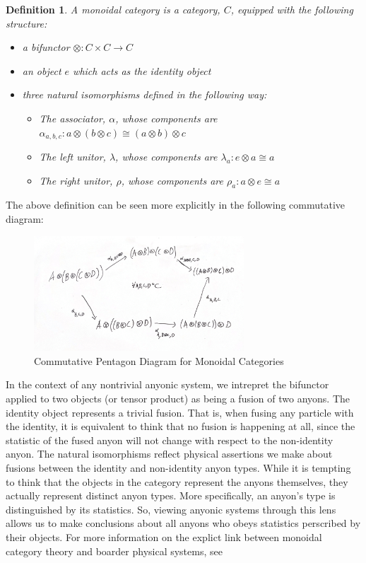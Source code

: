 \documentclass[10pt]{ucthesis}
\newtheorem{definition}{Definition}[chapter]
\begin{document}
\begin{definition}
	A monoidal category is a category, $C$, equipped with the following structure:
\begin{itemize}
	\item a bifunctor $\otimes:C\times C\rightarrow C$
	\item an object $e$ which acts as the identity object
	\item three natural isomorphisms defined in the following way:
		\begin{itemize}
			\item The associator, $\alpha$, whose components are $\alpha_{a,b,c}: a\otimes(b\otimes c) \cong (a\otimes b)\otimes c$
			\item The left unitor, $\lambda$, whose components are $\lambda_a : e\otimes a \cong a$
			\item The right unitor, $\rho$, whose components are $\rho_a:a\otimes e \cong a$
		\end{itemize}
\end{itemize}
\end{definition}

The above definition can be seen more explicitly in the following commutative diagram:


\begin{figure}[H]
	\centering
	\includegraphics[width=0.7\textwidth]{pent diag.png}
	\caption{Commutative Pentagon Diagram for Monoidal Categories}
\end{figure}


In the context of any nontrivial anyonic system, we intrepret the bifunctor applied to two objects (or tensor product) as being a fusion of two anyons. The identity object represents a trivial fusion. That is, when fusing any particle with the identity, it is equivalent to think that no fusion is happening at all, since the statistic of the fused anyon will not change with respect to the non-identity anyon. The natural isomorphisms reflect physical assertions we make about fusions between the identity and non-identity anyon types. While it is tempting to think that the objects in the category represent the anyons themselves, they actually represent distinct anyon types. More specifically, an anyon's type is distinguished by its statistics. So, viewing anyonic systems through this lens allows us to make conclusions about all anyons who obeys statistics perscribed by their objects. For more information on the explict link between monoidal category theory and boarder physical systems, see \cite{Rose3}
\end{document}
